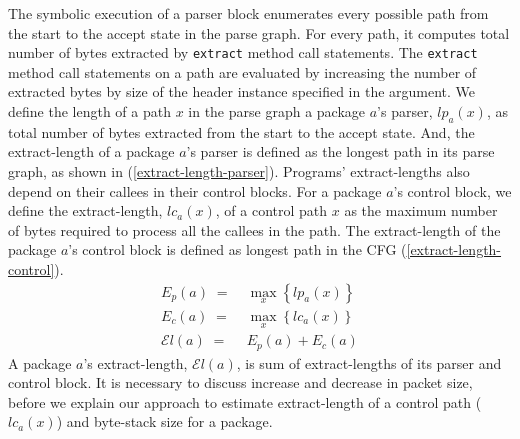 \documentclass[letterpaper,twocolumn,10pt]{article}
\begin{document}
The symbolic execution of a parser block enumerates every possible path from the start to the accept state in the parse graph.
For every path, it computes total number of bytes extracted by \texttt{extract} method call statements.
The \texttt{extract} method call statements on a path are evaluated by increasing the number of extracted bytes by size of the header instance specified in the argument.
We define the length of a path $x$ in the parse graph a package $a$'s parser, $lp_{a}(x)$, as total number of bytes extracted from the start to the accept state.
And, the extract-length of a package $a$'s parser is defined as the longest path in its parse graph, as shown in (\ref{extract-length-parser}).
Programs' extract-lengths also depend on their callees in their control blocks.
For a package $a$'s control block, we define the extract-length, $lc_{a}(x)$, of a control path $x$ as the maximum number of bytes required to process all the callees in the path.
The extract-length of the package $a$'s control block is defined as longest path in the CFG (\ref{extract-length-control}).
\begin{align}
E_{p}(a)\; =& \; \max_{x}\left\{lp_{a}(x)\right\} \label{extract-length-parser} \\
E_{c}(a)\; =& \; \max_{x}\left\{lc_{a}(x)\right\} \label{extract-length-control} \\
\mathcal{E}l(a)\; =& \; E_{p}(a) + E_{c}(a) \label{extract-length-program}
\end{align}
A package $a$'s extract-length, $\mathcal{E}l(a)$, is sum of extract-lengths of its parser and control block.
It is necessary to discuss increase and decrease in packet size, before we explain our approach to estimate extract-length of a control path ($lc_{a}(x)$) and byte-stack size for a package.
\end{document}
